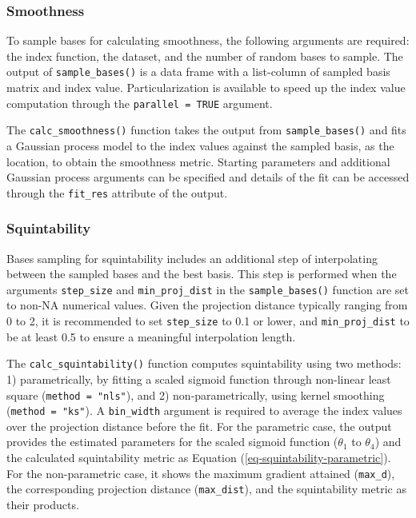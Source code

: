 \documentclass[
  12pt,
]{interact}
\theoremstyle{plain}
\begin{document}
\subsubsection{Smoothness}\label{smoothness}

To sample bases for calculating smoothness, the following arguments are
required: the index function, the dataset, and the number of random
bases to sample. The output of \texttt{sample\_bases()} is a data frame
with a list-column of sampled basis matrix and index value.
Particularization is available to speed up the index value computation
through the \texttt{parallel\ =\ TRUE} argument.

The \texttt{calc\_smoothness()} function takes the output from
\texttt{sample\_bases()} and fits a Gaussian process model to the index
values against the sampled basis, as the location, to obtain the
smoothness metric. Starting parameters and additional Gaussian process
arguments can be specified and details of the fit can be accessed
through the \texttt{fit\_res} attribute of the output.

\subsubsection{Squintability}\label{squintability}

Bases sampling for squintability includes an additional step of
interpolating between the sampled bases and the best basis. This step is
performed when the arguments \texttt{step\_size} and
\texttt{min\_proj\_dist} in the \texttt{sample\_bases()} function are
set to non-NA numerical values. Given the projection distance typically
ranging from 0 to 2, it is recommended to set \texttt{step\_size} to 0.1
or lower, and \texttt{min\_proj\_dist} to be at least 0.5 to ensure a
meaningful interpolation length.

The \texttt{calc\_squintability()} function computes squintability using
two methods: 1) parametrically, by fitting a scaled sigmoid function
through non-linear least square (\texttt{method\ =\ "nls"}), and 2)
non-parametrically, using kernel smoothing (\texttt{method\ =\ "ks"}). A
\texttt{bin\_width} argument is required to average the index values
over the projection distance before the fit. For the parametric case,
the output provides the estimated parameters for the scaled sigmoid
function (\(\theta_1\) to \(\theta_4\)) and the calculated squintability
metric as Equation (\ref{eq-squintability-parametric}). For the
non-parametric case, it shows the maximum gradient attained
(\texttt{max\_d}), the corresponding projection distance
(\texttt{max\_dist}), and the squintability metric as their products.
\end{document}

